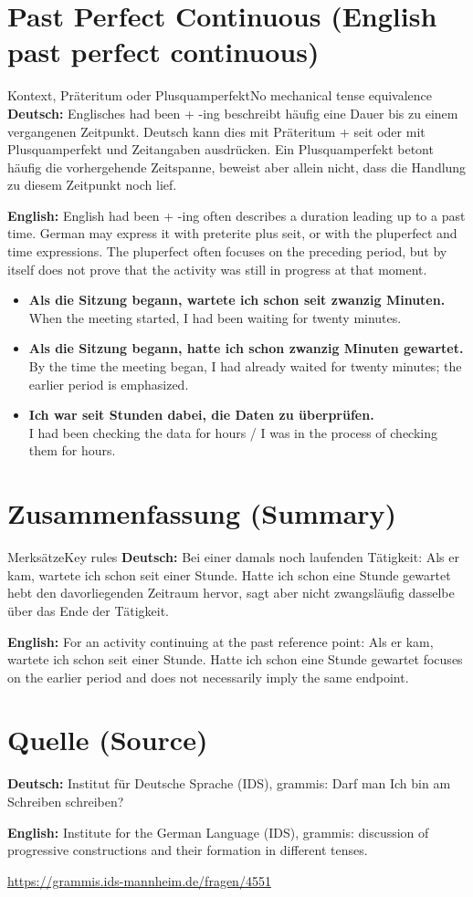\documentclass[a4paper,11pt]{article}
\newcommand{\GermanText}[1]{\textbf{Deutsch: }#1\par}
\newcommand{\EnglishText}[1]{{\small\color{SoftGray}\textbf{English: }#1\par}}
\newcommand{\ExampleItem}[2]{\item \textbf{#1}\\{\small\color{SoftGray}#2}}
\begin{document}
\section{Past Perfect Continuous \textnormal{(English past perfect continuous)}}
\begin{grammarentry}{Kontext, Präteritum oder Plusquamperfekt}{No mechanical tense equivalence}
\GermanText{Englisches had been + -ing beschreibt häufig eine Dauer bis zu einem vergangenen Zeitpunkt. Deutsch kann dies mit Präteritum + seit oder mit Plusquamperfekt und Zeitangaben ausdrücken. Ein Plusquamperfekt betont häufig die vorhergehende Zeitspanne, beweist aber allein nicht, dass die Handlung zu diesem Zeitpunkt noch lief.}
\EnglishText{English had been + -ing often describes a duration leading up to a past time. German may express it with preterite plus seit, or with the pluperfect and time expressions. The pluperfect often focuses on the preceding period, but by itself does not prove that the activity was still in progress at that moment.}
\end{grammarentry}
\begin{exbox}
\begin{itemize}
\ExampleItem{Als die Sitzung begann, wartete ich schon seit zwanzig Minuten.}{When the meeting started, I had been waiting for twenty minutes.}
\ExampleItem{Als die Sitzung begann, hatte ich schon zwanzig Minuten gewartet.}{By the time the meeting began, I had already waited for twenty minutes; the earlier period is emphasized.}
\ExampleItem{Ich war seit Stunden dabei, die Daten zu überprüfen.}{I had been checking the data for hours / I was in the process of checking them for hours.}
\end{itemize}
\end{exbox}

\section{Zusammenfassung \textnormal{(Summary)}}
\begin{grammarentry}{Merksätze}{Key rules}
\GermanText{Bei einer damals noch laufenden Tätigkeit: Als er kam, wartete ich schon seit einer Stunde. Hatte ich schon eine Stunde gewartet hebt den davorliegenden Zeitraum hervor, sagt aber nicht zwangsläufig dasselbe über das Ende der Tätigkeit.}
\EnglishText{For an activity continuing at the past reference point: Als er kam, wartete ich schon seit einer Stunde. Hatte ich schon eine Stunde gewartet focuses on the earlier period and does not necessarily imply the same endpoint.}
\end{grammarentry}

\section{Quelle \textnormal{(Source)}}
        \GermanText{Institut für Deutsche Sprache (IDS), grammis: Darf man Ich bin am Schreiben schreiben?}
        \EnglishText{Institute for the German Language (IDS), grammis: discussion of progressive constructions and their formation in different tenses.}
        \url{https://grammis.ids-mannheim.de/fragen/4551}
\end{document}
